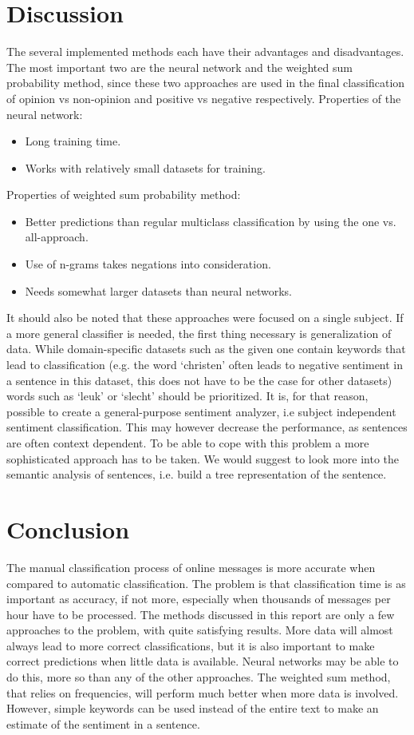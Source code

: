\documentclass[11pt]{article}
\begin{document}
\section{Discussion}
The several implemented methods each have their advantages and disadvantages. The most important two are the neural network and the weighted sum probability method, since these two approaches are used in the final classification of opinion vs non-opinion and positive vs negative respectively.
Properties of the neural network:
\begin{itemize}
\item Long training time.
\item Works with relatively small datasets for training.
\end{itemize}
Properties of weighted sum probability method:
\begin{itemize}
\item Better predictions than regular multiclass classification by using the one vs. all-approach.
\item Use of n-grams takes negations into consideration.
\item Needs somewhat larger datasets than neural networks.
\end{itemize}
It should also be noted that these approaches were focused on a single subject. If a more general classifier is needed, the first thing necessary is generalization of data. While domain-specific datasets such as the given one contain keywords that lead to classification (e.g. the word `christen' often leads to negative sentiment in a sentence in this dataset, this does not have to be the case for other datasets) words such as `leuk' or `slecht' should be prioritized. It is, for that reason, possible to create a general-purpose sentiment analyzer, i.e subject independent sentiment classification. This may however decrease the performance, as sentences are often context dependent. To be able to cope with this problem a more sophisticated approach has to be taken. We would suggest to look more into the semantic analysis of sentences, i.e. build a tree representation of the sentence.
\section{Conclusion}
The manual classification process of online messages is more accurate when compared to automatic classification. The problem is that classification time is as important as accuracy, if not more, especially when thousands of messages per hour have to be processed. The methods discussed in this report are only a few approaches to the problem, with quite satisfying results. More data will almost always lead to more correct classifications, but it is also important to make correct predictions when little data is available. Neural networks may be able to do this, more so than any of the other approaches. The weighted sum method, that relies on frequencies, will perform much better when more data is involved. However, simple keywords can be used instead of the entire text to make an estimate of the sentiment in a sentence.
\end{document}

